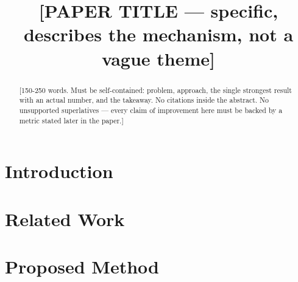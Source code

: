 \documentclass[conference]{IEEEtran}
\begin{document}
\title{[PAPER TITLE — specific, describes the mechanism, not a vague theme]}

\author{
}

\maketitle

\begin{abstract}
[150-250 words. Must be self-contained: problem, approach, the single strongest result with an actual number, and the takeaway. No citations inside the abstract. No unsupported superlatives — every claim of improvement here must be backed by a metric stated later in the paper.]
\end{abstract}

\begin{IEEEkeywords}
\end{IEEEkeywords}

\section{Introduction}

\section{Related Work}

\section{Proposed Method}
\end{document}
